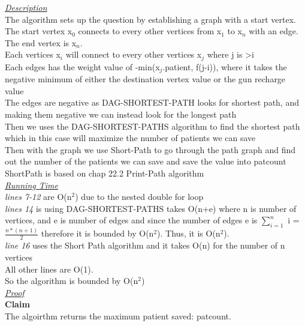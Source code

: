 \documentclass[10pt]{csc_assignment}
\begin{document}
\begin{description}
\emph{\underline{Description}}\\
The algorithm sets up the question by establishing a graph with a start vertex. \\
The start vertex x$_{0}$ connects to every other vertices from x$_{1}$ to x$_{n}$ with an edge.\\
The end vertex is x$_{n}$.\\
Each vertices x$_{i}$ will connect to every other vertices  x$_{j}$ where j is \textgreater i \\ 
Each edges has the weight value of -min(x$_{j}$.patient, f(j-i)), where it takes the negative minimum of either the destination vertex value or the gun recharge value \\
The edges are negative as DAG-SHORTEST-PATH looks for shortest path, and making them negative we can instead look for the longest path\\
 Then we uses the DAG-SHORTEST-PATHS algorithm to find the shortest path which in this case will maximize the number of patients we can save\\
Then with the graph we use Short-Path to go through the path graph and find out the number of the patients we can save and save the value into patcount\\
ShortPath is based on chap 22.2 Print-Path algorithm\\

\emph{\underline{Running Time}}\\
\emph{lines 7-12 } are O(n$^{2}$) due to the nested double for loop \\
\emph{lines 14} is using DAG-SHORTEST-PATHS takes O(n+e) where n is number of vertices, and e is number of edges and since the number of edges e is $\sum_{i = 1}^{n}$ i = $\frac{n * (n + 1)}{2}$ therefore it is bounded by O(n$^{2}$). Thus, it is O(n$^{2}$). \\
\emph{line 16} uses the Short Path algorithm and it takes O(n) for the number of n vertices\\
All other lines are O(1).\\
So the algorithm is bounded by O(n$^{2}$) \\

\emph{\underline{Proof}}\\
\textbf{Claim}\\
The algoirthm returns the maximum patient saved: patcount.\\
  

\end{description}
\end{document}
